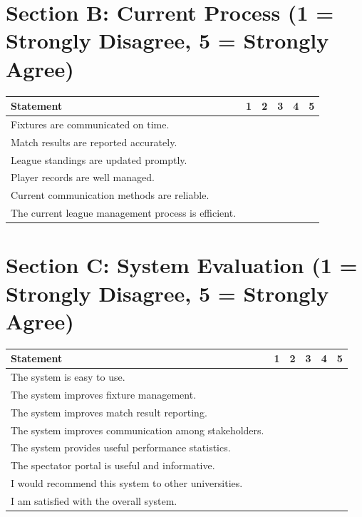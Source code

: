 \documentclass[12pt,a4paper]{report}
\begin{document}
\section*{Section B: Current Process (1 = Strongly Disagree, 5 = Strongly Agree)}
\begin{longtable}{p{9cm}ccccc}
\toprule
\textbf{Statement} & \textbf{1} & \textbf{2} & \textbf{3} & \textbf{4} & \textbf{5}\\
\midrule
Fixtures are communicated on time. & & & & &\\
Match results are reported accurately. & & & & &\\
League standings are updated promptly. & & & & &\\
Player records are well managed. & & & & &\\
Current communication methods are reliable. & & & & &\\
The current league management process is efficient. & & & & &\\
\bottomrule
\end{longtable}

\section*{Section C: System Evaluation (1 = Strongly Disagree, 5 = Strongly Agree)}
\begin{longtable}{p{9cm}ccccc}
\toprule
\textbf{Statement} & \textbf{1} & \textbf{2} & \textbf{3} & \textbf{4} & \textbf{5}\\
\midrule
The system is easy to use. & & & & &\\
The system improves fixture management. & & & & &\\
The system improves match result reporting. & & & & &\\
The system improves communication among stakeholders. & & & & &\\
The system provides useful performance statistics. & & & & &\\
The spectator portal is useful and informative. & & & & &\\
I would recommend this system to other universities. & & & & &\\
I am satisfied with the overall system. & & & & &\\
\bottomrule
\end{longtable}
\end{document}
